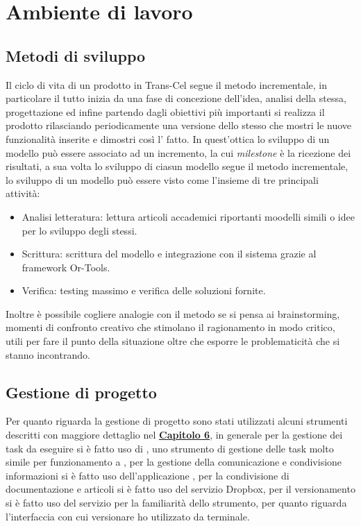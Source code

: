 \section{Ambiente di lavoro}
\subsection{Metodi di sviluppo}
Il ciclo di vita di un prodotto in Trans-Cel segue il metodo incrementale, in particolare il tutto inizia da una fase di concezione dell'idea, analisi della stessa, progettazione ed infine partendo dagli obiettivi più importanti si realizza il prodotto rilasciando periodicamente una versione dello stesso che mostri le nuove funzionalità inserite e dimostri così l' fatto. In quest'ottica lo sviluppo di un modello può essere associato ad un incremento, la cui \textit{milestone} è la ricezione dei risultati, a sua volta lo sviluppo di ciasun modello segue il metodo incrementale, lo sviluppo di un modello può essere visto come l'insieme di tre principali attività:
\begin{itemize}
	\item Analisi letteratura: lettura articoli accademici riportanti moodelli simili o idee per lo sviluppo degli stessi.
	\item Scrittura: scrittura del modello e integrazione con il sistema grazie al framework Or-Tools.
	\item Verifica: testing massimo e verifica delle soluzioni fornite.
\end{itemize}
Inoltre è possibile cogliere analogie con il metodo  se si pensa ai brainstorming, momenti di confronto creativo che stimolano il ragionamento in modo critico, utili per fare il punto della situazione oltre che esporre le problematicità che si stanno incontrando.
	
\subsection{Gestione di progetto}
Per quanto riguarda la gestione di progetto sono stati utilizzati alcuni strumenti descritti con maggiore dettaglio nel \hyperlink{(chap:capitolo6)}{\textbf{Capitolo 6}}, in generale per la gestione dei task da eseguire si è fatto uso di , uno strumento di gestione delle task molto simile per funzionamento a , per la gestione della comunicazione e condivisione informazioni si è fatto uso dell'applicazione , per la condivisione di documentazione e articoli si è fatto uso del servizio Dropbox, per il versionamento si è fatto uso del servizio  per la familiarità dello strumento, per quanto riguarda l'interfaccia con cui versionare ho utilizzato  da terminale.
	
